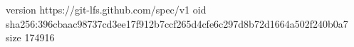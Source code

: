 version https://git-lfs.github.com/spec/v1
oid sha256:396cbaac98737cd3ee17f912b7ccf265d4cfe6c297d8b72d1664a502f240b0a7
size 174916
